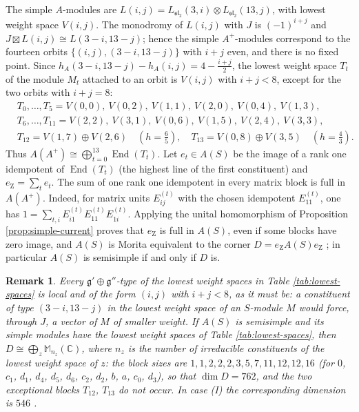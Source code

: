 \documentclass[leqno]{article}
\newcommand{\Cbb}{\ensuremath{\mathbb{C}}}
\newcommand{\Mat}{\ensuremath{\mathbb{M}}}
\newcommand{\ot}{\otimes}
\newtheorem{remark}[thm]{Remark}
\numberwithin{equation}{section}
\begin{document}
The simple $A$-modules are $L(i,j) = L_{\mathfrak{sl}_2}(3,i) \ot L_{\mathfrak{sl}_2}(13,j)$, with lowest weight space $V(i,j)$. The monodromy of $L(i,j)$ with $J$ is $(-1)^{i+j}$ and $J \boxtimes L(i,j) \cong L(3-i,13-j)$; hence the simple $A^+$-modules correspond \cite{DLM96,HKL15} to the fourteen orbits $\{(i,j),(3-i,13-j)\}$ with $i+j$ even, and there is no fixed point. Since $h_A(3-i,13-j) - h_A(i,j) = 4 - \frac{i+j}{2}$, the lowest weight space $T_t$ of the module $M_t$ attached to an orbit is $V(i,j)$ with $i+j < 8$, except for the two orbits with $i + j = 8$:
\begin{equation}
\label{eq:affine-blocks}
\begin{aligned}
&T_0, \ldots, T_5 = V(0,0),\ V(0,2),\ V(1,1),\ V(2,0),\ V(0,4),\ V(1,3),\\
&T_6, \ldots, T_{11} = V(2,2),\ V(3,1),\ V(0,6),\ V(1,5),\ V(2,4),\ V(3,3),\\
&T_{12} = V(1,7) \oplus V(2,6) \quad (h = \tfrac65), \quad T_{13} = V(0,8) \oplus V(3,5) \quad (h = \tfrac43).
\end{aligned}
\end{equation}
Thus $A(A^+) \cong \bigoplus_{t=0}^{13}\operatorname{End}(T_t)$. Let $e_t \in A(S)$ be the image of a rank one idempotent of $\operatorname{End}(T_t)$ (the highest line of the first constituent) and $e_{\mathrm Z} = \sum_t e_t$. The sum of one rank one idempotent in every matrix block is full in $A(A^+)$. Indeed, for matrix units $E^{(t)}_{ij}$ with the chosen idempotent $E^{(t)}_{11}$, one has $1 = \sum_{t,i}E^{(t)}_{i1}E^{(t)}_{11}E^{(t)}_{1i}$. Applying the unital homomorphism of Proposition \ref{prop:simple-current} proves that $e_{\mathrm Z}$ is full in $A(S)$, even if some blocks have zero image, and $A(S)$ is Morita equivalent to the corner $D = e_{\mathrm Z}A(S)e_{\mathrm Z}$ \cite[Lemma 8.2]{Rie26b}; in particular $A(S)$ is semisimple if and only if $D$ is.

\begin{remark}\normalfont
\label{rem:expected-corner}
Every $\mathfrak g' \oplus \mathfrak g''$-type of the lowest weight spaces in Table \ref{tab:lowest-spaces} is local and of the form $(i,j)$ with $i+j < 8$, as it must be: a constituent of type $(3-i,13-j)$ in the lowest weight space of an $S$-module $M$ would force, through $J$, a vector of $M$ of smaller weight. If $A(S)$ is semisimple and its simple modules have the lowest weight spaces of Table \ref{tab:lowest-spaces}, then $D \cong \bigoplus_{z} \Mat_{n_z}(\Cbb)$, where $n_z$ is the number of irreducible constituents of the lowest weight space of $z$: the block sizes are $1, 1, 2, 2, 2, 3, 5, 7, 11, 12, 12, 16$ (for $0$, $c_1$, $d_1$, $d_4$, $d_5$, $d_6$, $c_2$, $d_2$, $b$, $a$, $c_0$, $d_3$), so that $\dim D = 762$, and the two exceptional blocks $T_{12}$, $T_{13}$ do not occur. In case (I) the corresponding dimension is $546$ \cite[Proposition 9.5]{Rie26b}.
\end{remark}
\end{document}
